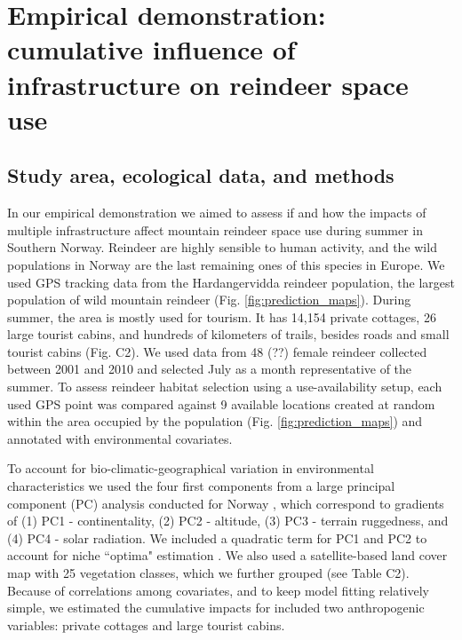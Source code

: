 \documentclass[titlepage]{article}
\begin{document}
\section{Empirical demonstration: cumulative influence of infrastructure on reindeer space use}

\subsection{Study area, ecological data, and methods}

In our empirical demonstration we aimed to assess if and how the impacts of multiple infrastructure affect mountain reindeer space use during summer in Southern Norway. Reindeer are highly sensible to human activity, and the wild populations in Norway are the last remaining ones of this species in Europe. We used GPS tracking data from the Hardangervidda reindeer population, the largest population of wild mountain reindeer (Fig. \ref{fig:prediction_maps}). During summer, the area is mostly used for tourism. It has 14,154 private cottages, 26 large tourist cabins, and hundreds of kilometers of trails, besides roads and small tourist cabins (Fig. C2). We used data from 48 (??) female reindeer collected between 2001 and 2010 \citep[see][for further details]{panzacchi_searching_2015} and selected July as a month representative of the summer. To assess reindeer habitat selection using a use-availability setup, each used GPS point was compared against 9 available locations created at random within the area occupied by the population (Fig. \ref{fig:prediction_maps}) and annotated with environmental covariates.

To account for bio-climatic-geographical variation in environmental characteristics we used the four first components from a large principal component (PC) analysis conducted for Norway \citep{bakkestuen_step-less_2008}, which correspond to gradients of (1) PC1 - continentality, (2) PC2 - altitude, (3) PC3 - terrain ruggedness, and (4) PC4 - solar radiation. We included a quadratic term for PC1 and PC2 to account for niche ``optima" estimation \citep[\textit{sensu}][]{panzacchi_searching_2015}. We also used a satellite-based land cover map with 25 vegetation classes, which we further grouped (see Table C2). Because of correlations among covariates, and to keep model fitting relatively simple, we estimated the cumulative impacts for included two anthropogenic variables: private cottages and large tourist cabins.
\end{document}

